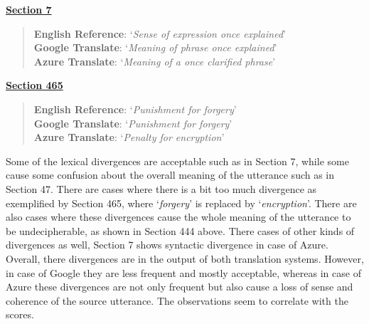 \underline{\textbf{Section 7}}
\begin{quote}
    \textbf{English Reference}: `\textit{Sense of expression once explained}'\\
    \textbf{Google Translate}: `\textit{Meaning of phrase once explained}'\\
    \textbf{Azure Translate}: `\textit{Meaning of a once clarified phrase}'
\end{quote}

\underline{\textbf{Section 465}}
\begin{quote}
    \textbf{English Reference}: `\textit{Punishment for forgery}'\\
    \textbf{Google Translate}: `\textit{Punishment for forgery}'\\
    \textbf{Azure Translate}: `\textit{Penalty for encryption}'
\end{quote}
\doublespacing

Some of the lexical divergences are acceptable such as in Section 7, while some cause some confusion about the overall meaning of the utterance such as in Section 47. There are cases where there is a bit too much divergence as exemplified by Section 465, where `\textit{forgery}' is replaced by `\textit{encryption}'. There are also cases where these divergences cause the whole meaning of the utterance to be undecipherable, as shown in Section 444 above. There cases of other kinds of divergences as well, Section 7 shows syntactic divergence in case of Azure. Overall, there divergences are in the output of both translation systems. However, in case of Google they are less frequent and mostly acceptable, whereas in case of Azure these divergences are not only frequent but also cause a loss of sense and coherence of the source utterance. The observations seem to correlate with the scores.